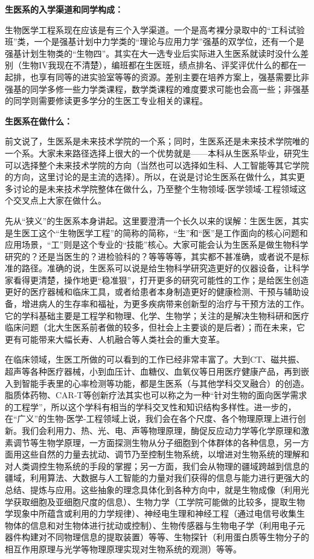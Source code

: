 \documentclass[11pt,oneside]{book}
\begin{document}
\textbf{生医系的入学渠道和同学构成：}

生物医学工程系现在应该是有三个入学渠道。一个是高考裸分录取中的“工科试验班”类，一个是强基计划中力学类的“理论与应用力学”强基的双学位，还有一个是强基计划生物类的“生物四”。其实在大一选专业后实际进入生医系就读时没什么差别（生物IV我现在不清楚），编班都在生医班，绩点排名、评奖评优什么的都在一起排，也享有同等的进实验室等等的资源。差别主要在培养方案上，强基需要比非强基的同学多修一些力学类课程，数学类课程的难度要求可能也会高一些；非强基的同学则需要修读更多学分的生医工专业相关的课程。

\textbf{生医系在做什么：}

前文说了，生医系是未来技术学院的一个系；同时，生医系还是未来技术学院唯的一个系。大家未来路径选择上很大的一个优势就是——本科从生医系毕业，研究生可以选择整个未来技术学院的方向（当然也可以选择如生科、人工智能等其它学院的方向，这里讨论的是主流的选择）。所以，在说是讨论生医系在做什么，其实更多讨论的是未来技术学院整体在做什么，乃至整个生物领域-医学领域-工程领域这个交叉点上大家在做什么。

先从“狭义”的生医系本身讲起。这里要澄清一个长久以来的误解：生医生医，其实是生医工这个“生物医学工程”的简称的简称，“生”和“医”是工作面向的核心问题和应用场景，“工”则是这个专业的“技能”核心。大家可能会认为生医系是做生物科学研究的？还是当医生的？进检验科的？等等等等，其实都不甚准确，或者说不是标准的路径。准确的说，生医系可以说是给生物科学研究造更好的仪器设备，让科学家看得更清楚，操作地更“稳准狠”，打开更多的研究可能性的工作；是给医生创造更好的医疗器械和临床工具，或者给患者本身制造更好的健康检测、干预与辅助设备，增进病人的生存率和福祉，为更多疾病带来创新型的治疗与干预方法的工作。它的学科基础主要是工程学和物理、化学、生物学；关注的是解决生物科研和医疗临床问题（北大生医系前者做的较多，但社会上主要谈的是后者）；而在未来，它更有可能带来大幅长寿、人机融合等人类社会的重大变革。

在临床领域，生医工所做的可以看到的工作已经非常丰富了。大到CT、磁共振、超声等各种医疗器械，小到血压计、血糖仪、血氧仪等日用医疗健康产品，再到嵌入到智能手表里的心率检测等功能，都是生医系（与其他学科交叉融合）的创造。脂质体药物、CAR-T等创新疗法其实也可以称之为一种“针对生物的面向医学需求的工程学”，所以这个学科有相当的学科交叉性和知识结构多样性。进一步的，在“广义”的生物-医学-工程领域上说，我们会在各个尺度、各个物理原理上进行创新。我们会利用力、热、光、电、声等物理原理，酶促反应动力学等化学原理和激素调节等生物学原理，一方面探测生物从分子细胞到个体群体的各种信息，另一方面用这些自然的力量去扰动、调节乃至控制生物系统，以增进对生物系统的理解和对人类调控生物系统的手段的掌握；另一方面，我们会从物理的疆域跨越到信息的疆域，利用算法、大数据与人工智能的力量对我们获得的信息与能力进行更强大的总结、提炼与应用。这些抽象的理念具体化到各种方向中，就是生物成像（利用光学获取细胞及亚细胞尺度的信息）、生物力学（工学院可能做的比较多，提取生物学现象中所蕴含或利用的力学规律）、神经电生理和神经工程（通过电信号收集生物体的信息和对生物体进行扰动或控制）、生物传感器与生物电子学（利用电子元器件构建对不同物理信息的提取装置）等等、生物探针（利用蛋白质等生物分子的相互作用原理与光学等物理原理实现对生物系统的观测）等等。
\end{document}
